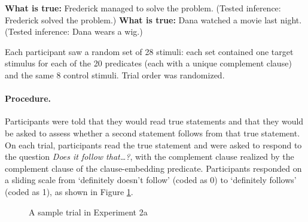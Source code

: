 \documentclass{language}
\newcommand{\6}{\mbox{$[\hspace*{-.6mm}[$}}
\newcommand{\9}{\mbox{$]\hspace*{-.6mm}]$}}
\begin{document}
\begin{exe}
\ex\label{control-good2} {\bf What is true:} Frederick managed to solve the problem. (Tested inference: Frederick solved the problem.)
\ex\label{control-bad2}  {\bf What is true:} Dana watched a movie last night. (Tested inference: Dana wears a wig.)
\end{exe}

Each participant saw a random set of 28 stimuli: each set contained one target stimulus for each of the 20 predicates (each with a unique complement clause) and the same 8 control stimuli. Trial order was randomized.

\paragraph{Procedure.} Participants were told that they would read true statements and that they would be asked to assess whether a second statement follows from that true statement. On each trial, participants read the true statement and were asked to respond to the question {\em Does it follow that\ldots?}, with the complement clause realized by the complement clause of the clause-embedding predicate. Participants responded on a sliding scale from `definitely doesn't follow' (coded as 0) to `definitely follows' (coded as 1), as shown in Figure \ref{f-trial-exp3}.


\begin{figure}[H]
\begin{center}
\end{center}
\caption{A sample trial in Experiment 2a}\label{f-trial-exp3}
\end{figure}
\end{document}
